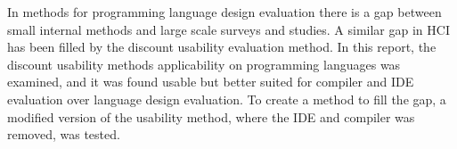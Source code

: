 In methods for programming language design evaluation there is a gap between small internal methods and large scale surveys and studies.
A similar gap in HCI has been filled by the discount usability evaluation method.
In this report, the discount usability methods applicability on programming languages was examined, and it was found usable but better suited for compiler and IDE evaluation over language design evaluation.
To create a method to fill the gap, a modified version of the usability method, where the IDE and compiler was removed, was tested.